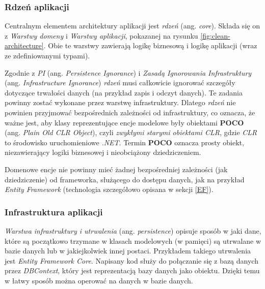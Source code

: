 \documentclass[12pt]{article}
\numberwithin{figure}{section}
\begin{document}
\begin{sloppypar}
    \subsubsection{Rdzeń aplikacji} \label{core}
    Centralnym elementem architektury aplikacji jest \textit{rdzeń} (ang. \textit{core}). Składa się on z \textit{Warstwy domeny} i \textit{Warstwy aplikacji}, pokazanej na rysunku \ref{fig:clean-architecture}. Obie te warstwy zawierają logikę biznesową i logikę aplikacji (wraz ze zdefiniowanymi typami). 
        
    Zgodnie z \textit{PI} (ang. \textit{Persistence Ignorance}) i \textit{Zasadą Ignorowania Infrastruktury} (ang.  \textit{Infrastructure Ignorance}) \textit{rdzeń} musi całkowicie ignorować szczegóły dotyczące trwałości danych (na przykład zapis i odczyt danych). Te zadania powinny zostać wykonane przez warstwę infrastruktury. Dlatego \textit{rdzeń} nie powinien przyjmować bezpośrednich zależności od infrastruktury, co oznacza, że ważne jest, aby klasy reprezentujące encje modelowe były obiektami \textbf{POCO} (ang. \textit{Plain Old CLR Object}), czyli \textit{zwykłymi starymi obiektami CLR}, gdzie \textit{CLR} to środowisko uruchomieniowe \textit{.NET}. Termin \textbf{POCO} oznacza prosty obiekt, niezawierający logiki biznesowej i nieobciążony dziedziczeniem.
        
    Domenowe encje nie powinny mieć żadnej bezpośredniej zależności (jak dziedziczenie) od frameworka, służącego do dostępu danych, jak na przykład \textit{Entity Framework} (technologia szczegółowo opisana w sekcji \ref{EF}).
        
    \subsubsection{Infrastruktura aplikacji}
    \textit{Warstwa infrastruktury i utrwalenia} (ang. \textit{persistence}) opisuje sposób w jaki dane, które są początkowo trzymane w klasach modelowych (w pamięci) są utrwalane w bazie danych lub w jakiejkolwiek innej postaci. Przykładem takiego utrwalenia jest \textit{Entity Framework Core}. Napisany kod służy do połączanie się z bazą danych przez \textit{DBContext}, który jest reprezentacją bazy danych jako obiektu. Dzięki temu w łatwy sposób można operować na danych w bazie danych.
        

\end{sloppypar}
\end{document}
